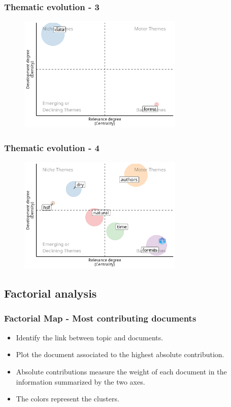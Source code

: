 \documentclass[aspectratio=169]{beamer}
\begin{document}
\begin{frame}
	\frametitle{Thematic evolution - 3}
    \begin{figure}
        \centering
        \includegraphics[width=0.7\textwidth]{figures/thematic_evolution_3.png}
    \end{figure}
\end{frame}

\begin{frame}
	\frametitle{Thematic evolution - 4}
    \begin{figure}
        \centering
        \includegraphics[width=0.7\textwidth]{figures/thematic_evolution_4.png}
    \end{figure}
\end{frame}



\subsection{Factorial analysis}

\begin{frame}
	\frametitle{Factorial Map - Most contributing documents}
	\begin{itemize}
		\item Identify the link between topic and documents.
		\item Plot the document associated to the highest absolute contribution.
		\item Absolute contributions measure the weight of each document in
		      the information summarized by the two axes.
		\item The colors represent the clusters.
	\end{itemize}
\end{frame}
\end{document}
